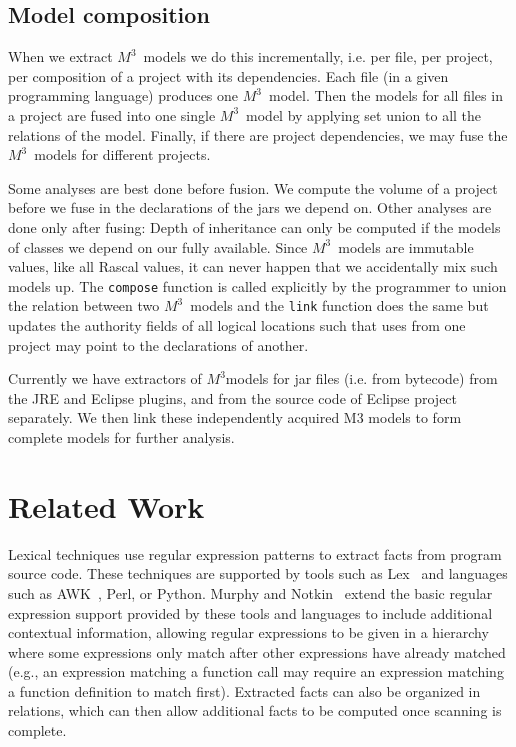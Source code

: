 \documentclass[conference]{IEEEtran}
\newcommand{\mthree}{\ensuremath{M^3}}
\begin{document}
\subsection{Model composition} When we extract \mthree\  models we do this
incrementally, i.e. per file, per project, per composition of a project with
its dependencies. Each file (in a given programming language) produces one
\mthree\  model. Then the models for all files in a project are fused into one
single \mthree\  model by applying set union to all the relations of the
model. Finally, if there are project dependencies, we may fuse the \mthree\
models for different projects.

Some analyses are best done before fusion. We compute the volume of a project
before we fuse in the declarations of the jars we depend on. Other analyses
are done only after fusing: Depth of inheritance can only be computed if the
models of classes we depend on our fully available. Since \mthree\  models are
immutable values, like all Rascal values, it can never happen that we
accidentally mix such models up. The \texttt{compose} function is called
explicitly by the programmer to union the relation between two \mthree\ models
and the \texttt{link} function does the same but updates the authority fields
of all logical locations such that uses from one project may point to the
declarations of another.

Currently we have extractors of \mthree models for jar files (i.e. from
bytecode) from the JRE and Eclipse plugins, and from the source code of
Eclipse project separately.  We then link these independently acquired M3
models to form complete models for further analysis.

\section{Related Work}

Lexical techniques use regular expression patterns to extract facts from
program source code. These techniques are supported by tools such as Lex~\cite{Lex}
and languages such as AWK~\cite{AWK79}, Perl, or Python. Murphy and
Notkin~\cite{MurphyNotkin95,DBLP:journals/tosem/MurphyN96} extend the
basic regular expression support provided by these tools and languages
to include additional contextual information, allowing regular
expressions to be given in a hierarchy where some expressions only match after
other expressions have already matched (e.g., an expression matching a
function call may require an expression matching a function definition to
match first). Extracted facts can also be organized in relations, which can
then allow additional facts to be computed once scanning is complete.
\end{document}
